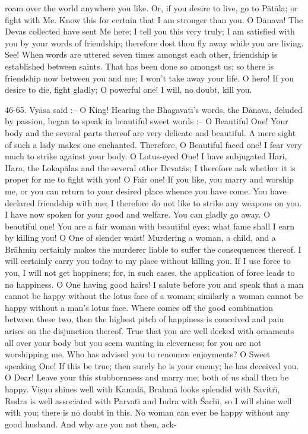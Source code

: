 roam over the world anywhere you like. Or, if you desire to live, go to P\=at\=ala; or fight with Me. Know this for certain that I am stronger than you. O D\=anava! The Devas collected have sent Me here; I tell you this very truly; I am satisfied with you by your words of friendship; therefore dost thou fly away while you are living. See! When words are uttered seven times amongst each other, friendship is established between saints. That has been done so amongst us; so there is friendship now between you and me; I won't take away your life. O hero! If you desire to die, fight gladly; O powerful one! I will, no doubt, kill you.

46-65. Vy\=asa said :-- O King! Hearing the Bhagavat\={\i}'s words, the D\=anava, deluded by passion, began to speak in beautiful sweet words :-- O Beautiful One! Your body and the several parts thereof are very delicate and beautiful. A mere sight of such a lady makes one enchanted. Therefore, O Beautiful faced one! I fear very much to strike against your body. O Lotus-eyed One! I have subjugated Hari, Hara, the Lokap\=alas and the several other Devat\=as; I therefore ask whether it is proper for me to fight with you! O Fair one! If you like, you marry and worship me, or you can return to your desired place whence you have come. You have declared friendship with me; I therefore do not like to strike any weapons on you. I have now spoken for your good and welfare. You can gladly go away. O beautiful one! You are a fair woman with beautiful eyes; what fame shall I earn by killing you! O One of slender waist! Murdering a woman, a child, and a Br\=ahmi\d{n} certainly makes the murderer liable to suffer the consequences thereof. I will certainly carry you today to my place without killing you. If I use force to you, I will not get happiness; for, in such cases, the application of force leads to no happiness. O One having good hairs! I salute before you and speak that a man cannot be happy without the lotus face of a woman; similarly a woman cannot be happy without a man's lotus face. Where comes off the good combination between these two, then the highest pitch of happiness is conceived and pain arises on the disjunction thereof. True that you are well decked with ornaments all over your body but you seem wanting in cleverness; for you are not worshipping me. Who has advised you to renounce enjoyments? O Sweet speaking One! If this be true; then surely he is your enemy; he has deceived you. O Dear! Leave your this stubbornness and marry me; both of us shall then be happy. Vi\d{s}\d{n}u shines well with Kamal\=a, Brahm\=a looks splendid with Savitr\={\i}, Rudra is well associated with Parvat\={\i} and Indra with \'Sach\={\i}, so I will shine well with you; there is no doubt in this. No woman can ever be happy without any good husband. And why are you not then, ack-

